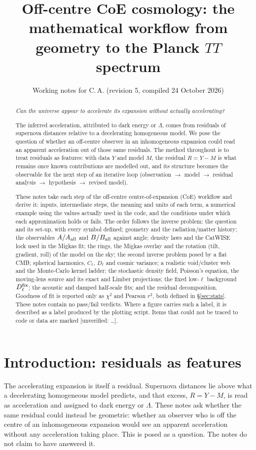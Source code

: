 \documentclass[10pt,twocolumn]{article}
\title{Off-centre CoE cosmology: the mathematical workflow from geometry to the Planck $TT$ spectrum}
\author{Working notes for C.\,A. \quad (revision 5, compiled 24 October 2026)}
\date{}
\newcommand{\flag}[1]{\textsf{[unverified: #1]}}
\begin{document}
\maketitle
\begin{abstract}
\begin{center}\itshape Can the universe appear to accelerate its expansion without actually accelerating?\end{center}
\noindent The inferred acceleration, attributed to dark energy or $\Lambda$, comes from residuals of supernova distances relative to a decelerating homogeneous model. We pose the question of whether an off-centre observer in an inhomogeneous expansion could read an apparent acceleration out of those same residuals. The method throughout is to treat residuals as features: with data $Y$ and model $M$, the residual $R=Y-M$ is what remains once known contributions are modelled out, and its structure becomes the observable for the next step of an iterative loop (observation $\to$ model $\to$ residual analysis $\to$ hypothesis $\to$ revised model).\par\medskip
These notes take each step of the off-centre centre-of-expansion (CoE) workflow and derive it: inputs, intermediate steps, the meaning and units of each term, a numerical example using the values actually used in the code, and the conditions under which each approximation holds or fails. The order follows the inverse problem: the question and its set-up, with every symbol defined; geometry and the radiation/matter history; the observables $A/A_{\rm all}$ and $B/B_{\rm all}$ against angle; density laws and the CatWISE lock used in the Migkas fit; the rings, the Migkas overlay and the rotation (tilt, gradient, roll) of the model on the sky; the second inverse problem posed by a flat CMB; spherical harmonics, $C_\ell$, $D_\ell$ and cosmic variance; a realistic void/cluster web and the Monte-Carlo kernel ladder; the stochastic density field, Poisson's equation, the moving-lens source and its exact and Limber projections; the fixed low-$\ell$ background $D^{\rm fix}_\ell$; the acoustic and damped half-scale fits; and the residual decomposition. Goodness of fit is reported only as $\chi^2$ and Pearson $r^2$, both defined in \S\ref{sec:stats}. These notes contain no pass/fail verdicts. Where a figure carries such a label, it is described as a label produced by the plotting script. Items that could not be traced to code or data are marked \flag{\ldots}.
\end{abstract}

\section*{Introduction: residuals as features}
The accelerating expansion is itself a residual. Supernova distances lie above what a decelerating homogeneous model predicts, and that excess, $R=Y-M$, is read as acceleration and assigned to dark energy or $\Lambda$. These notes ask whether the same residual could instead be geometric: whether an observer who is off the centre of an inhomogeneous expansion would see an apparent acceleration without any acceleration taking place. This is posed as a question. The notes do not claim to have answered it.
\end{document}
